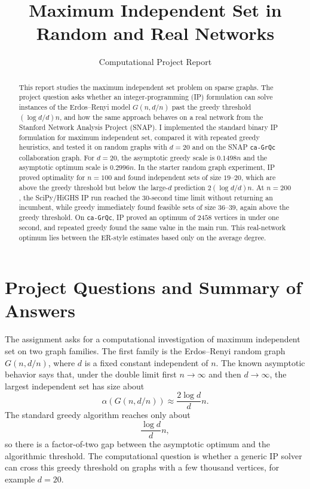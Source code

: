 \documentclass[11pt]{article}
\title{Maximum Independent Set in Random and Real Networks}
\author{Computational Project Report}
\date{}
\begin{document}
\maketitle

\begin{abstract}
This report studies the maximum independent set problem on sparse graphs. The
project question asks whether an integer-programming (IP) formulation can solve
instances of the Erdos--Renyi model $G(n,d/n)$ past the greedy threshold
$(\log d/d)n$, and how the same approach behaves on a real network from the
Stanford Network Analysis Project (SNAP). I implemented the standard binary IP
formulation for maximum independent set, compared it with repeated greedy
heuristics, and tested it on random graphs with $d=20$ and on the SNAP
\texttt{ca-GrQc} collaboration graph. For $d=20$, the asymptotic greedy scale is
$0.1498n$ and the asymptotic optimum scale is $0.2996n$. In the starter random
graph experiment, IP proved optimality for $n=100$ and found independent sets of
size $19$--$20$, which are above the greedy threshold but below the large-$d$
prediction $2(\log d/d)n$. At $n=200$, the SciPy/HiGHS IP run reached the
30-second time limit without returning an incumbent, while greedy immediately
found feasible sets of size $36$--$39$, again above the greedy threshold. On
\texttt{ca-GrQc}, IP proved an optimum of $2458$ vertices in under one second,
and repeated greedy found the same value in the main run. This real-network
optimum lies between the ER-style estimates based only on the average degree.
\end{abstract}

\section{Project Questions and Summary of Answers}

The assignment asks for a computational investigation of maximum independent
set on two graph families. The first family is the Erdos--Renyi random graph
$G(n,d/n)$, where $d$ is a fixed constant independent of $n$. The known
asymptotic behavior says that, under the double limit first $n \to \infty$ and
then $d \to \infty$, the largest independent set has size about
\[
  \alpha(G(n,d/n)) \approx \frac{2\log d}{d}n.
\]
The standard greedy algorithm reaches only about
\[
  \frac{\log d}{d}n,
\]
so there is a factor-of-two gap between the asymptotic optimum and the
algorithmic threshold. The computational question is whether a generic IP
solver can cross this greedy threshold on graphs with a few thousand vertices,
for example $d=20$.
\end{document}
